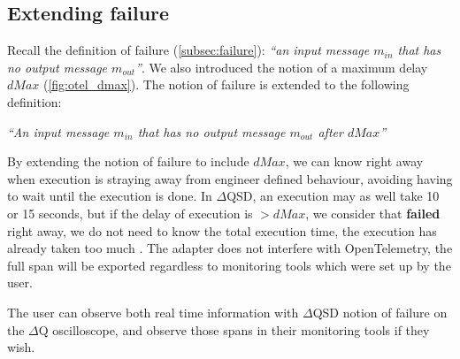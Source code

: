 \subsection{Extending failure}
   Recall the definition of failure (\cref{subsec:failure}): \textit{``an input message $m_{in}$ that has no output message $m_{out}$''}. We also introduced the notion of a maximum delay $dMax$ (\cref{fig:otel_dmax}). 
The notion of failure is extended to the following definition:
        \begin{center}
            \textit{``An input message $m_{in}$ that has no output message $m_{out}$ after $dMax$''} 
        \end{center}
   By extending the notion of failure to include $dMax$, we can know right away when execution is straying away from engineer defined behaviour, avoiding having to wait until the execution is done. In $\Delta$QSD, an execution may as well take 10 or 15 seconds, but if the delay of execution is $> dMax$, we consider that \textbf{failed} right away, we do not need to know the total execution time, the execution has already taken too much \cite{myo}. The adapter does not interfere with OpenTelemetry, the full span will be exported regardless to monitoring tools which were set up by the user. 

   The user can observe both real time information with $\Delta$QSD notion of failure on the $\Delta$Q oscilloscope, and observe those spans in their monitoring tools if they wish.
